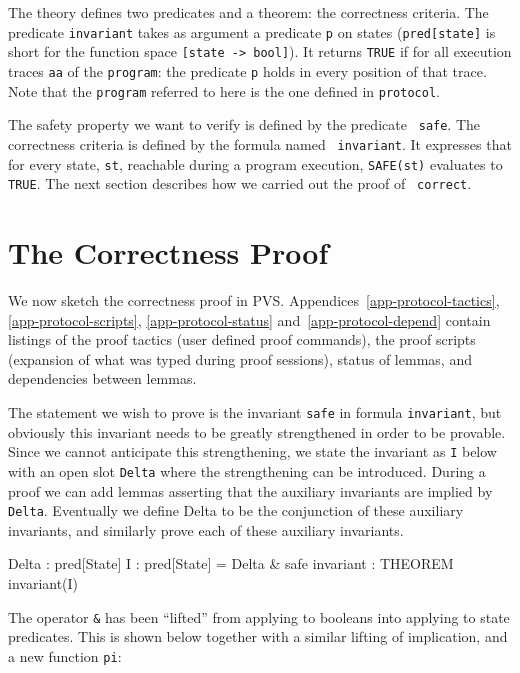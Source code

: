 The  theory defines two  predicates  and  a  theorem: the  correctness
criteria.  The predicate {\tt invariant} takes as argument a predicate
{\tt p} on states ({\tt  pred[state]} is short for the  function  space
{\tt [state ->  bool]}). It  returns {\tt TRUE} if for all  execution
traces {\tt aa} of the  {\tt program}: the  predicate {\tt p} holds in
every position of that trace. Note  that the {\tt program} referred to
here is the one defined in {\tt protocol}.

The safety property we want to verify is defined by the predicate {\tt
safe}.  The correctness criteria is  defined by the formula named {\tt
invariant}.   It expresses that for  every   state, {\tt st},  reachable
during   a program execution,    {\tt  SAFE(st)}  evaluates  to   {\tt
TRUE}. The next section describes how we carried out the proof of {\tt
correct}.


\section{The Correctness Proof}

We now sketch the correctness  proof in PVS\@.
Appendices~\ref{app-protocol-tactics}, \ref{app-protocol-scripts},
\ref{app-protocol-status} and~\ref{app-protocol-depend}  
contain listings  of the proof  tactics  (user defined proof commands),
the proof scripts (expansion of what was typed during proof sessions),
status of lemmas, and dependencies between lemmas.

The statement we wish to prove is the invariant {\tt safe} in
formula {\tt invariant}, but obviously
this invariant needs to be greatly strengthened in order to be provable.
Since we cannot anticipate this strengthening, we state the invariant as
{\tt I} below with an open slot {\tt Delta} where the
strengthening can be introduced.  During a proof we can add lemmas
asserting that the auxiliary invariants are implied by {\tt Delta}\@.
Eventually we define Delta to be the conjunction of these auxiliary
invariants, and similarly prove each of these auxiliary invariants.

\begin{smallsession}
  Delta : pred[State]
  I : pred[State] = Delta & safe
  invariant : THEOREM invariant(I)
\end{smallsession}

The operator {\tt \&} has been ``lifted'' from applying to booleans into
applying to state predicates.  This  is shown  below together  with  a
similar lifting of implication, and a new function {\tt pi}:


